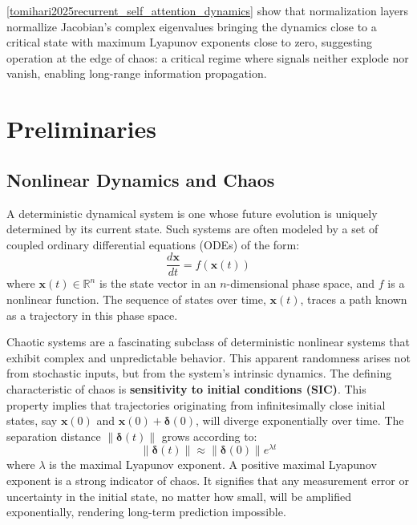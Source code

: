 \documentclass[a4paper,12pt]{article}
\begin{document}
\ref{tomihari2025recurrent_self_attention_dynamics} show that normalization layers normallize Jacobian's complex eigenvalues bringing the dynamics close to a critical state with maximum Lyapunov exponents close to zero, suggesting operation at the edge of chaos: a critical regime where signals neither explode nor vanish, enabling long-range information propagation.






\section{Preliminaries}


\subsection{Nonlinear Dynamics and Chaos}
A deterministic dynamical system is one whose future evolution is uniquely determined by its current state. Such systems are often modeled by a set of coupled ordinary differential equations (ODEs) of the form:
\begin{equation}
    \frac{d\mathbf{x}}{dt} = f(\mathbf{x}(t))
\end{equation}
where $\mathbf{x}(t) \in \mathbb{R}^n$ is the state vector in an $n$-dimensional phase space, and $f$ is a nonlinear function. The sequence of states over time, $\mathbf{x}(t)$, traces a path known as a trajectory in this phase space.

Chaotic systems are a fascinating subclass of deterministic nonlinear systems that exhibit complex and unpredictable behavior. This apparent randomness arises not from stochastic inputs, but from the system's intrinsic dynamics. The defining characteristic of chaos is \textbf{sensitivity to initial conditions (SIC)}. This property implies that trajectories originating from infinitesimally close initial states, say $\mathbf{x}(0)$ and $\mathbf{x}(0) + \bm{\delta}(0)$, will diverge exponentially over time. The separation distance $\|\bm{\delta}(t)\|$ grows according to:
\begin{equation}
    \|\bm{\delta}(t)\| \approx \|\bm{\delta}(0)\| e^{\lambda t}
\end{equation}
where $\lambda$ is the maximal Lyapunov exponent. A positive maximal Lyapunov exponent is a strong indicator of chaos. It signifies that any measurement error or uncertainty in the initial state, no matter how small, will be amplified exponentially, rendering long-term prediction impossible.
\end{document}
